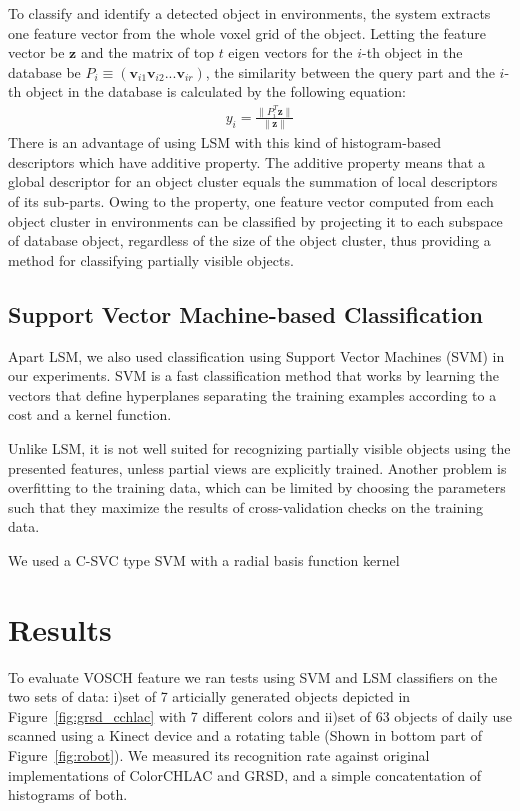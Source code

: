 \documentclass[conference]{sty/IEEEtran}
\begin{document}
To classify and identify a detected object in environments, the system extracts one feature vector from the whole voxel grid of the object. 
Letting the feature vector be $\bm{z}$ and the matrix of top $t$ eigen vectors for the $i$-th object in the database be $P_i \equiv (\bm{v}_{i1} \bm{v}_{i2} ... \bm{v}_{ir})$,
the similarity between the query part and the $i$-th object in the database is calculated by the following equation:
\begin{eqnarray}\label{eq:y_calc}
  y_i = \frac{\| P_i^T \bm{z} \|}{\| \bm{z} \|}
\end{eqnarray}
There is an advantage of using LSM with this kind of histogram-based descriptors which have additive property. 
The additive property means that a global descriptor for an object cluster equals the summation of local descriptors of its sub-parts. 
Owing to the property, one feature vector computed from each object cluster in environments can be classified by projecting it to 
each subspace of database object, regardless of the size of the object cluster, thus providing a method for classifying partially visible objects.

\subsection{Support Vector Machine-based Classification}
Apart LSM, we also used classification using Support Vector Machines (SVM) \cite{svm99} in our experiments.
SVM is a fast classification method that works by learning the vectors that define hyperplanes separating
the training examples according to a cost and a kernel function.

Unlike LSM, it is not well suited for recognizing partially visible objects using the presented features,
unless partial views are explicitly trained. Another problem is overfitting to the training data, which
can be limited by choosing the parameters such that they maximize the results of cross-validation checks
on the training data.

We used a C-SVC type SVM with a radial basis function kernel \cite{LIBSVM}

\section{Results}
\label{sec:results}
To evaluate VOSCH feature we ran 
tests using SVM and LSM classifiers on the two sets of data: 
i)set of 7 articially generated objects depicted in Figure~\ref{fig:grsd_cchlac}
with 7 different colors and ii)set of 63 objects of daily use scanned using
a Kinect device and a rotating table (Shown in bottom part of Figure~\ref{fig:robot}). 
We measured its recognition rate against original implementations of ColorCHLAC and 
GRSD, and a simple concatentation of histograms of both.
\end{document}
